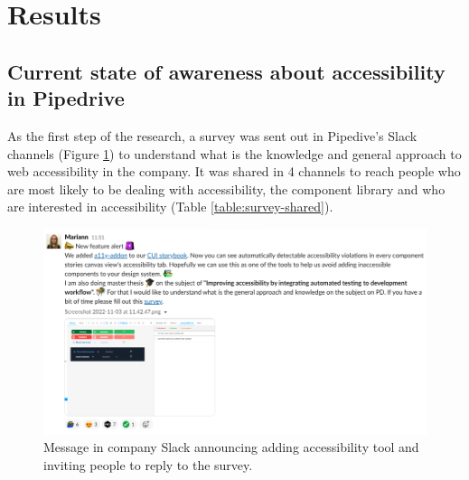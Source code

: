 \documentclass{master_thesis}
\begin{document}
\section{Results} \label{chap:results}




\subsection{Current state of awareness about accessibility in Pipedrive}


As the first step of the research, a survey was sent out in Pipedive's Slack channels (Figure \ref{fig:slack-message}) to understand what is the knowledge and general approach to web accessibility in the company. It was shared in 4 channels to reach people who are most likely to be dealing with accessibility, the component library and who are interested in accessibility (Table \ref{table:survey-shared}).

\begin{figure}[H]
	\centering
	\includegraphics[width=\textwidth]{img/survey.png}
	\caption{Message in company Slack announcing adding accessibility tool and inviting people to reply to the survey.}
	\label{fig:slack-message}
\end{figure}
\end{document}

